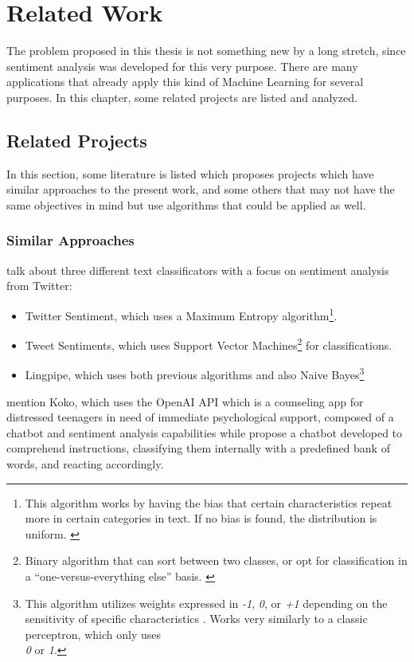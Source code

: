 \chapter{Related Work}
The problem proposed in this thesis is not something new by a long stretch, since sentiment analysis was developed for this very purpose. There are many applications that already apply this kind of Machine Learning for several purposes. In this chapter, some related projects are listed and analyzed.

\section{Related Projects}
In this section, some literature is listed which proposes projects which have similar approaches to the present work, and some others that may not have the same objectives in mind but use algorithms that could be applied as well.
\subsection{Similar Approaches}
\citet{rf10} talk about three different text classificators with a focus on sentiment analysis from Twitter:\\ 
\begin{itemize}
\item Twitter Sentiment, which uses a Maximum Entropy algorithm\footnote{This algorithm works by having the bias that certain characteristics repeat more in certain categories in text. If no bias is found, the distribution is uniform. \citep{rf17}}.
\item Tweet Sentiments, which uses Support Vector Machines\footnote{Binary algorithm that can sort between two classes, or opt for classification in a ``one-versus-everything else'' basis. \citep{rf18}} for classifications.
\item Lingpipe, which uses both previous algorithms and also Naive Bayes\footnote{This algorithm utilizes weights expressed in \textit{-1}, \textit{0}, or \textit{+1} depending on the sensitivity of specific characteristics \citep{rf19}. Works very similarly to a classic perceptron, which only uses\\ \textit{0} or \textit{1}.}
\end{itemize}
\citet{rf6} mention Koko, which uses the OpenAI API which is a counseling app for distressed teenagers in need of immediate psychological support, composed of a chatbot and sentiment analysis capabilities while
\citet{rf14} propose a chatbot developed to comprehend instructions, classifying them internally with a predefined bank of words, and reacting accordingly.

